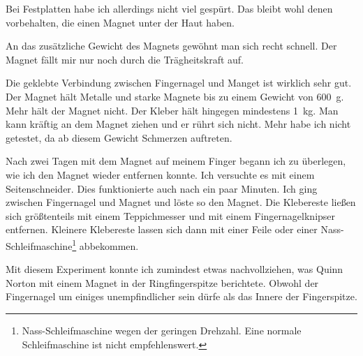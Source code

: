 Bei Festplatten habe ich allerdings nicht viel gespürt. Das bleibt wohl denen vorbehalten, die
einen Magnet unter der Haut haben.

An das zusätzliche Gewicht des Magnets gewöhnt man sich recht schnell. Der Magnet fällt mir nur noch
durch die Trägheitskraft auf.

Die geklebte Verbindung zwischen Fingernagel und Manget ist wirklich sehr gut. Der Magnet hält
Metalle und starke Magnete bis zu einem Gewicht von \SI{600}{\gram}. Mehr hält der Magnet nicht. Der
Kleber hält hingegen mindestens \SI{1}{\kilo\gram}.
Man kann kräftig an dem Magnet ziehen und er rührt sich nicht.
Mehr habe ich nicht getestet, da ab diesem
Gewicht Schmerzen auftreten.

Nach zwei Tagen mit dem Magnet auf meinem Finger begann ich zu überlegen, wie ich den Magnet wieder
entfernen konnte. Ich versuchte es mit einem Seitenschneider. Dies funktionierte auch nach ein paar
Minuten. Ich ging zwischen Fingernagel und Magnet und löste so den Magnet. Die Klebereste ließen
sich größtenteils mit einem Teppichmesser und mit einem Fingernagelknipser entfernen.
Kleinere Klebereste lassen sich dann mit einer Feile oder einer
Nass-Schleifmaschine\footnote{Nass-Schleifmaschine wegen der geringen Drehzahl. Eine normale
Schleifmaschine ist nicht empfehlenswert.} abbekommen.

Mit diesem Experiment konnte ich zumindest etwas nachvollziehen, was Quinn Norton mit einem Magnet
in der Ringfingerspitze berichtete. Obwohl der Fingernagel um einiges unempfindlicher sein dürfe als
das Innere der Fingerspitze.
